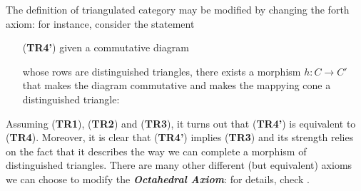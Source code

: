 \begin{rmk}
    The definition of triangulated category
    may be modified by changing the forth axiom:
    for instance, consider the statement
    \begin{itemize}
        \item[(\textbf{TR4'})]  given a commutative diagram
        \begin{center}
        \end{center}
        whose rows are distinguished triangles,
        there exists a morphism $h:C \to C'$
        that makes the diagram commutative and
        makes the mappying cone a distinguished triangle:
        \begin{center}
        \end{center}
    \end{itemize}
    Assuming (\textbf{TR1}), (\textbf{TR2}) and (\textbf{TR3}),
    it turns out that (\textbf{TR4'}) is equivalent to (\textbf{TR4}).
    Moreover, it is clear that (\textbf{TR4'}) implies (\textbf{TR3})
    and its strength relies on the fact that it describes the way we can
    complete a morphism of distinguished triangles.
    There are many other different (but equivalent) axioms we can choose
    to modify the \emph{\textbf{Octahedral Axiom}}: for details,
    check \parencite[]{neeman}.
\end{rmk}


